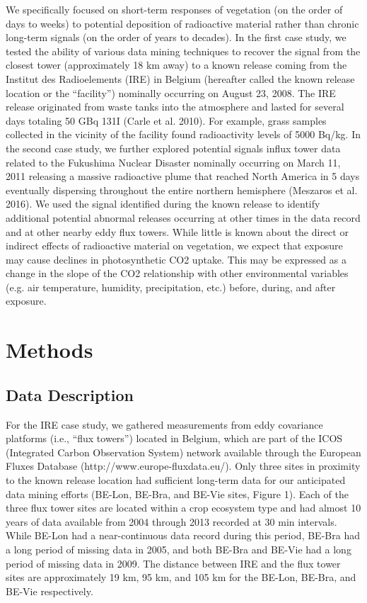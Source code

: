 \documentclass{article}
\begin{document}
We specifically focused on short-term responses of vegetation (on the order of days to weeks) to potential deposition of radioactive material rather than chronic long-term signals (on the order of years to decades). In the first case study, we tested the ability of various data mining techniques to recover the signal from the closest tower (approximately 18 km away) to a known release coming from the Institut des Radioelements (IRE) in Belgium (hereafter called the known release location or the “facility”) nominally occurring on August 23, 2008. The IRE release originated from waste tanks into the atmosphere and lasted for several days totaling 50 GBq 131I (Carle et al. 2010). For example, grass samples collected in the vicinity of the facility found radioactivity levels of 5000 Bq/kg. In the second case study, we further explored potential signals influx tower data related to the Fukushima Nuclear Disaster nominally occurring on March 11, 2011 releasing a massive radioactive plume that reached North America in 5 days eventually dispersing throughout the entire northern hemisphere (Meszaros et al. 2016). We used the signal identified during the known release to identify additional potential abnormal releases occurring at other times in the data record and at other nearby eddy flux towers. While little is known about the direct or indirect effects of radioactive material on vegetation, we expect that exposure may cause declines in photosynthetic CO2 uptake. This may be expressed as a change in the slope of the CO2 relationship with other environmental variables (e.g. air temperature, humidity, precipitation, etc.) before, during, and after exposure.


\section{Methods}

\subsection{Data Description}

For the IRE case study, we gathered measurements from eddy covariance platforms (i.e., “flux towers”) located in Belgium, which are part of the ICOS (Integrated Carbon Observation System) network available through the European Fluxes Database (http://www.europe-fluxdata.eu/). Only three sites in proximity to the known release location had sufficient long-term data for our anticipated data mining efforts (BE-Lon, BE-Bra, and BE-Vie sites, Figure 1). Each of the three flux tower sites are located within a crop ecosystem type and had almost 10 years of data available from 2004 through 2013 recorded at 30 min intervals. While BE-Lon had a near-continuous data record during this period, BE-Bra had a long period of missing data in 2005, and both BE-Bra and BE-Vie had a long period of missing data in 2009. The distance between IRE and the flux tower sites are approximately 19 km, 95 km, and 105 km for the BE-Lon, BE-Bra, and BE-Vie respectively.
\end{document}

